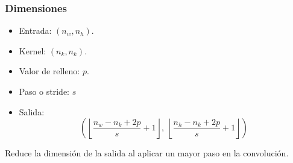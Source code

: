 \begin{frame}
    \frametitle{Dimensiones}

    \begin{itemize}
        \item Entrada: $(n_w,n_h)$.
        \item Kernel: $(n_k,n_k)$.
        \item Valor de relleno: $p$.
        \item Paso o stride: $s$
        \item Salida: 
        \[
            \left(\left\lfloor \frac{n_w - n_k + 2p}{s} + 1 \right\rfloor ,\  \left\lfloor \frac{n_h - n_k + 2p}{s} + 1 \right\rfloor\right)
        \]
    \end{itemize}

    Reduce la dimensión de la salida al aplicar un mayor paso en la convolución.

\end{frame}

